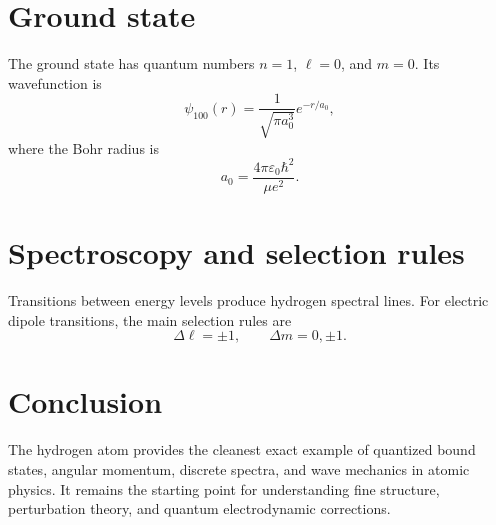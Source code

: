 \documentclass[11pt]{article}
\begin{document}
\section{Ground state}
The ground state has quantum numbers $n=1$, $\ell=0$, and $m=0$. Its wavefunction is
\[
\psi_{100}(r)=\frac{1}{\sqrt{\pi a_0^3}}e^{-r/a_0},
\]
where the Bohr radius is
\[
a_0 = \frac{4\pi\varepsilon_0\hbar^2}{\mu e^2}.
\]

\section{Spectroscopy and selection rules}
Transitions between energy levels produce hydrogen spectral lines. For electric dipole transitions, the main selection rules are
\[
\Delta \ell = \pm 1,
\qquad
\Delta m = 0, \pm 1.
\]

\section{Conclusion}
The hydrogen atom provides the cleanest exact example of quantized bound states, angular momentum, discrete spectra, and wave mechanics in atomic physics. It remains the starting point for understanding fine structure, perturbation theory, and quantum electrodynamic corrections.
\end{document}
